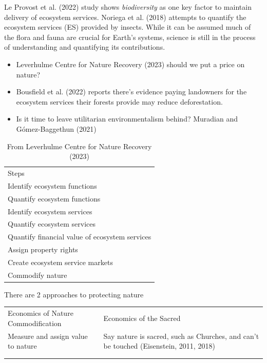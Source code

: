 \documentclass[
  letterpaper,
  DIV=11,
  numbers=noendperiod]{scrartcl}
\providecommand{\tightlist}{%
  \setlength{\itemsep}{0pt}\setlength{\parskip}{0pt}}\usepackage{longtable,booktabs,array}
\begin{document}
Le Provost et al. (2022) study shows \emph{biodiversity} as one key
factor to maintain delivery of ecosystem services. Noriega et al. (2018)
attempts to quantify the ecosystem services (ES) provided by insects.
While it can be assumed much of the flora and fauna are crucial for
Earth's systems, science is still in the process of understanding and
quantifying its contributions.

\begin{itemize}
\tightlist
\item
  Leverhulme Centre for Nature Recovery (2023) should we put a price on
  nature?
\item
  Bousfield et al. (2022) reports there's evidence paying landowners for
  the ecosystem services their forests provide may reduce deforestation.
\item
  Is it time to leave utilitarian environmentalism behind? Muradian and
  Gómez-Baggethun (2021)
\end{itemize}

\begin{longtable}[]{@{}l@{}}
\caption{From Leverhulme Centre for Nature Recovery
(2023)}\tabularnewline
\toprule\noalign{}
\endfirsthead
\endhead
\bottomrule\noalign{}
\endlastfoot
9 Steps \\
Identify ecosystem functions \\
Quantify ecosystem functions \\
Identify ecosystem services \\
Quantify ecosystem services \\
Quantify financial value of ecosystem services \\
Assign property rights \\
Create ecosystem service markets \\
Commodify nature \\
\end{longtable}

There are 2 approaches to protecting nature

\begin{longtable}[]{@{}
  >{\raggedright\arraybackslash}p{}
  >{\raggedright\arraybackslash}p{}@{}}
\toprule\noalign{}
\endhead
\bottomrule\noalign{}
\endlastfoot
Economics of Nature Commodification & Economics of the Sacred \\
Measure and assign value to nature & Say nature is sacred, such as
Churches, and can't be touched (Eisenstein, 2011, 2018) \\
& \\
& \\
\end{longtable}
\end{document}
